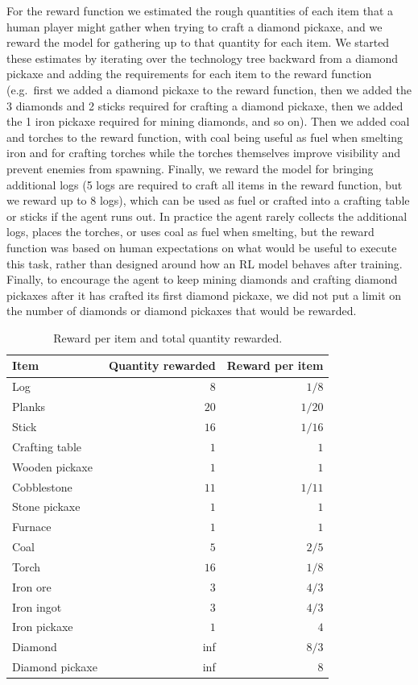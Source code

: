For the reward function we estimated the rough quantities of each item that a human player might gather when trying to craft a diamond pickaxe, and we reward the model for gathering up to that quantity for each item.
We started these estimates by iterating over the technology tree backward from a diamond pickaxe and adding the requirements for each item to the reward function (e.g.\ first we added a diamond pickaxe to the reward function, then we added the 3 diamonds and 2 sticks required for crafting a diamond pickaxe, then we added the 1 iron pickaxe required for mining diamonds, and so on).
Then we added coal and torches to the reward function, with coal being useful as fuel when smelting iron and for crafting torches while the torches themselves improve visibility and prevent enemies from spawning. 
Finally, we reward the model for bringing additional logs (5 logs are required to craft all items in the reward function, but we reward up to 8 logs), which can be used as fuel or crafted into a crafting table or sticks if the agent runs out.
In practice the agent rarely collects the additional logs, places the torches, or uses coal as fuel when smelting, but the reward function was based on human expectations on what would be useful to execute this task, rather than designed around how an RL model behaves after training.
Finally, to encourage the agent to keep mining diamonds and crafting diamond pickaxes after it has crafted its first diamond pickaxe, we did not put a limit on the number of diamonds or diamond pickaxes that would be rewarded.

\begin{table}[]
\begin{center}
\begin{tabular}{|l|r|r|}
\hline
\textbf{Item} & \textbf{Quantity rewarded} & \textbf{Reward per item} \\
\hline
Log & $8$ & $1/8$ \\
Planks & $20$ & $1/20$ \\
Stick & $16$ & $1/16$ \\
Crafting table & $1$ & $1$ \\
Wooden pickaxe & $1$ & $1$ \\
Cobblestone & $11$ & $1/11$ \\
Stone pickaxe & $1$ & $1$ \\
Furnace & $1$ & $1$ \\
Coal & $5$ & $2/5$ \\
Torch & $16$ & $1/8$ \\
Iron ore & $3$ & $4/3$ \\
Iron ingot & $3$ & $4/3$ \\
Iron pickaxe & $1$ & $4$ \\
Diamond & inf & $8/3$ \\
Diamond pickaxe & inf & $8$ \\
\hline
\end{tabular}
\end{center}
\caption{Reward per item and total quantity rewarded.}
\label{tab:rlreward}
\end{table}


